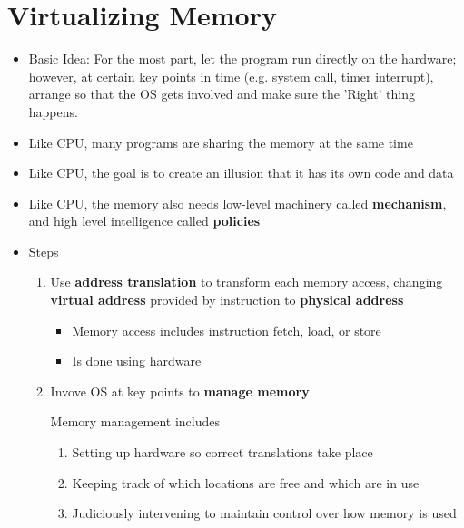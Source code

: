\documentclass[12pt]{article}
\begin{document}
\section{Virtualizing Memory}
\begin{itemize}
    \item Basic Idea: For the most part, let the program run directly on the hardware;
    however, at certain key points in time (e.g. system call, timer interrupt), arrange
    so that the OS gets involved and make sure the 'Right' thing happens.
    \item Like CPU, many programs are sharing the memory at the same time
    \item Like CPU, the goal is to create an illusion that it has its own code and data
    \item Like CPU, the memory also needs low-level machinery called \textbf{mechanism},
    and high level intelligence called \textbf{policies}
    \item Steps

    \begin{enumerate}[1.]
        \item Use \textbf{address translation} to transform each memory access,
        changing \textbf{virtual address} provided by instruction to \textbf{physical address}
        \begin{itemize}
            \item Memory access includes instruction fetch, load, or store
            \item Is done using hardware
        \end{itemize}
        \item Invove OS at key points to \textbf{manage memory}

        \bigskip

        Memory management includes

        \bigskip

        \begin{enumerate}[1.]
            \item Setting up hardware so correct translations take place
            \item Keeping track of which locations are free and which are in use
            \item Judiciously intervening to maintain control over how memory is used
        \end{enumerate}

        \bigskip
    \end{enumerate}
\end{itemize}
\end{document}
